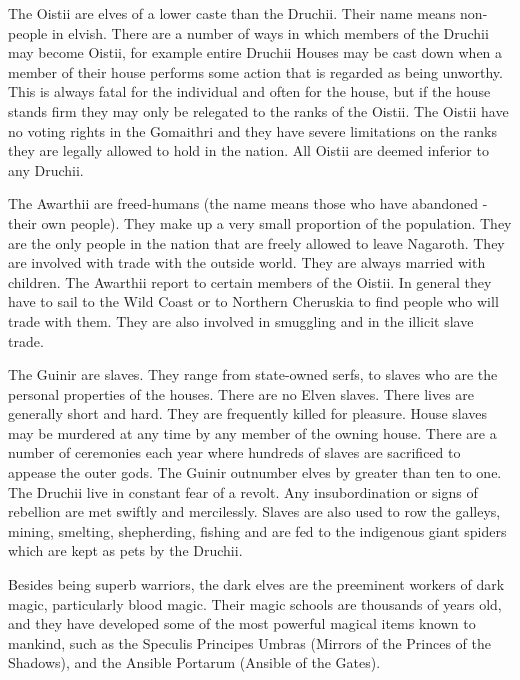 \documentclass[a4paper]{dnd5}
\begin{document}
The Oistii are elves of a lower caste than the Druchii.  Their name means non-people in elvish.  There are a number of ways in which members of the Druchii may become Oistii, for example entire Druchii Houses may be cast down when a member of their house performs some action that is regarded as being unworthy.  This is always fatal for the individual and often for the house, but if the house stands firm they may only be relegated to the ranks of the Oistii.  The Oistii have no voting rights in the Gomaithri and they have severe limitations on the ranks they are legally allowed to hold in the nation.  All Oistii are deemed inferior to any Druchii.

The Awarthii are freed-humans (the name means those who have abandoned - their own people).  They make up a very small proportion of the population.  They are the only people in the nation that are freely allowed to leave Nagaroth.  They are involved with trade with the outside world.  They are always married with children.  The Awarthii report to certain members of the Oistii. In general they have to sail to the Wild Coast or to Northern Cheruskia to find people who will trade with them. They are also involved in smuggling and in the illicit slave trade.

The Guinir are slaves.  They range from state-owned serfs, to slaves who are the personal properties of the houses.   There are no Elven slaves.   There lives are generally short and hard.  They are frequently killed for pleasure.  House slaves may be murdered at any time by any member of the owning house.  There are a number of ceremonies each year where hundreds of slaves are sacrificed to appease the outer gods.  The Guinir outnumber elves by greater than ten to one.  The Druchii live in constant fear of a revolt.  Any insubordination or signs of rebellion are met swiftly and mercilessly.  Slaves are also used to row the galleys, mining, smelting, shepherding, fishing and are fed to the indigenous giant spiders which are kept as pets by the Druchii.

Besides being superb warriors, the dark elves are the preeminent workers of dark magic, particularly blood magic.  Their magic schools are thousands of years old, and they have developed some of the most powerful magical items known to mankind, such as the Speculis Principes Umbras (Mirrors of the Princes of the Shadows), and the Ansible Portarum (Ansible of the Gates).
\end{document}
